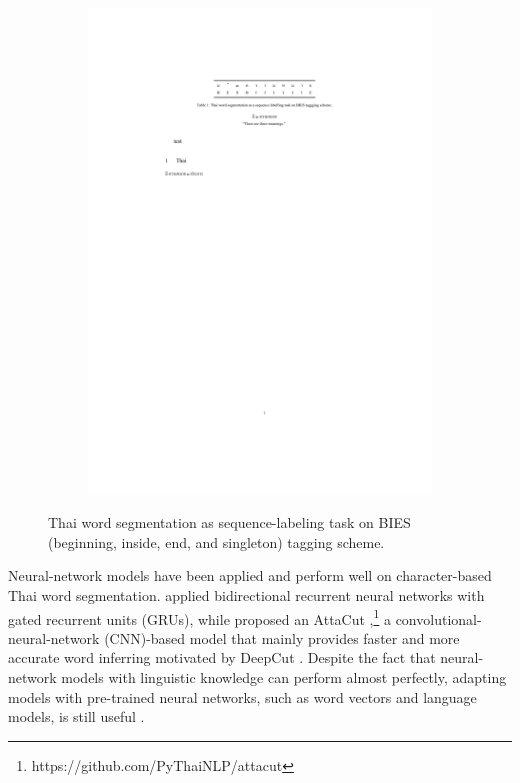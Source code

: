 \begin{figure}
\begin{subfigure}{0.24\textwidth}
        \includegraphics[width=\textwidth]{figures/fig-thbies-tran.pdf}
    \end{subfigure}
    \caption{Thai word segmentation as sequence-labeling task on BIES (beginning, inside, end, and singleton) tagging scheme.}
    \label{fig:thbies}
\end{figure}
%

Neural-network models have been applied and perform well on character-based Thai word segmentation.
%
 applied bidirectional recurrent neural networks with gated recurrent units (GRUs), while  proposed an AttaCut \cite{Chormai2019},\footnote{https://github.com/PyThaiNLP/attacut} a convolutional-neural-network (CNN)-based model that mainly provides faster and more accurate word inferring motivated by DeepCut \cite{Kittinaradorn2019}.
%
%
Despite the fact that neural-network models with linguistic knowledge can perform almost perfectly, adapting models with pre-trained neural networks, such as word vectors and language models, is still useful \cite{Shao2018,yan-etal-2020-bert}.
%

